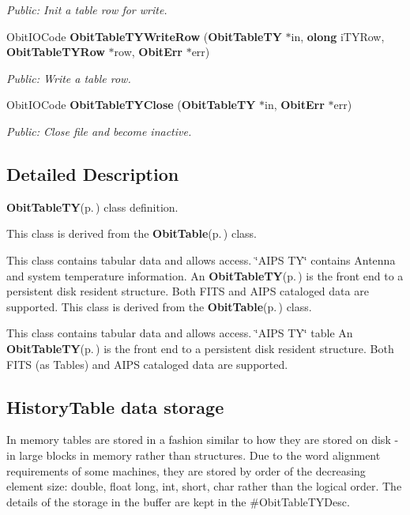 \begin{CompactItemize}
\begin{CompactList}\small\item\em Public: Init a table row for write. \item\end{CompactList}\item 
Obit\-IOCode {\bf Obit\-Table\-TYWrite\-Row} ({\bf Obit\-Table\-TY} $\ast$in, {\bf olong} i\-TYRow, {\bf Obit\-Table\-TYRow} $\ast$row, {\bf Obit\-Err} $\ast$err)
\begin{CompactList}\small\item\em Public: Write a table row. \item\end{CompactList}\item 
Obit\-IOCode {\bf Obit\-Table\-TYClose} ({\bf Obit\-Table\-TY} $\ast$in, {\bf Obit\-Err} $\ast$err)
\begin{CompactList}\small\item\em Public: Close file and become inactive. \item\end{CompactList}\end{CompactItemize}


\subsection{Detailed Description}
{\bf Obit\-Table\-TY}{\rm (p.\,\pageref{structObitTableTY})} class definition. 

This class is derived from the {\bf Obit\-Table}{\rm (p.\,\pageref{structObitTable})} class.

This class contains tabular data and allows access. \char`\"{}AIPS TY\char`\"{} contains Antenna and system temperature information. An {\bf Obit\-Table\-TY}{\rm (p.\,\pageref{structObitTableTY})} is the front end to a persistent disk resident structure. Both FITS and AIPS cataloged data are supported. This class is derived from the {\bf Obit\-Table}{\rm (p.\,\pageref{structObitTable})} class.

This class contains tabular data and allows access. \char`\"{}AIPS TY\char`\"{} table An {\bf Obit\-Table\-TY}{\rm (p.\,\pageref{structObitTableTY})} is the front end to a persistent disk resident structure. Both FITS (as Tables) and AIPS cataloged data are supported.\subsection{History\-Table data storage}\label{ObitTableWX_8h_TableDataStorage}
In memory tables are stored in a fashion similar to how they are stored on disk - in large blocks in memory rather than structures. Due to the word alignment requirements of some machines, they are stored by order of the decreasing element size: double, float long, int, short, char rather than the logical order. The details of the storage in the buffer are kept in the \#Obit\-Table\-TYDesc.

